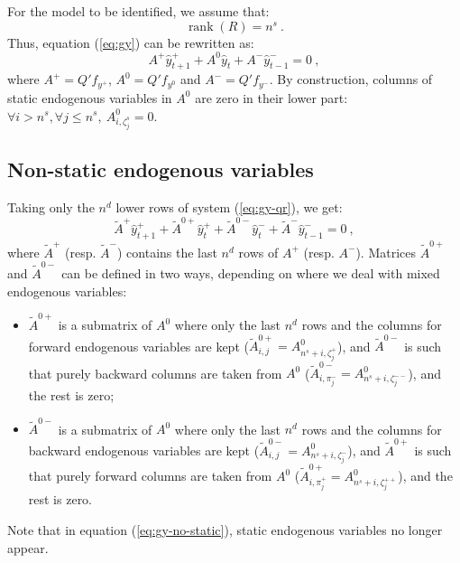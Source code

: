 \documentclass[11pt,a4paper]{article}
\begin{document}
For the model to be identified, we assume that:
\begin{equation}
  \label{eq:identification}
  \mathop{rank}(R) = n^s \: .
\end{equation}
Thus, equation (\ref{eq:gy}) can be rewritten as:
\begin{equation}
  \label{eq:gy-qr}
  A^+ \hat{y}^+_{t+1} + A^0 \hat{y}_t + A^- \hat{y}^-_{t-1} = 0 \: ,
\end{equation}
where $A^+ = Q'f_{y^+}$, $A^0 = Q'f_{y^0}$ and $A^- = Q'f_{y^-}$. By
construction, columns of static endogenous variables in $A^0$ are zero in their
lower part: $\forall i > n^s,\forall j\leq n^s, \: A^0_{i,\zeta^s_j} = 0$.

\subsection{Non-static endogenous variables}

Taking only the $n^d$ lower rows of system (\ref{eq:gy-qr}), we get:
\begin{equation}
  \label{eq:gy-no-static}
  \tilde{A}^+ \hat{y}^+_{t+1} + \tilde{A}^{0+} \hat{y}^+_t + \tilde{A}^{0-} \hat{y}^-_t + \tilde{A}^- \hat{y}^-_{t-1} = 0 \: ,
\end{equation}
where $\tilde{A}^+$ (resp. $\tilde{A}^-$) contains the last $n^d$ rows of $A^+$
(resp. $A^-$). Matrices $\tilde{A}^{0+}$ and $\tilde{A}^{0-}$ can be defined in
two ways, depending on where we deal with mixed endogenous variables:

\begin{itemize}
\item $\tilde{A}^{0+}$ is a submatrix of $A^0$ where only the last $n^d$ rows
  and the columns for forward endogenous variables are kept
  ($\tilde{A}^{0+}_{i,j} = A^0_{n^s+i, \zeta^+_j}$), and $\tilde{A}^{0-}$ is
  such that purely backward columns are taken from $A^0$
  ($\tilde{A}^{0-}_{i,\pi^-_j} = A^0_{n^s+i,\zeta^{--}_j}$), and the rest is
  zero;
\item $\tilde{A}^{0-}$ is a submatrix of $A^0$ where only the last $n^d$ rows
  and the columns for backward endogenous variables are kept
  ($\tilde{A}^{0-}_{i,j} = A^0_{n^s+i, \zeta^-_j}$), and $\tilde{A}^{0+}$ is
  such that purely forward columns are taken from $A^0$
  ($\tilde{A}^{0+}_{i,\pi^+_j} = A^0_{n^s+i,\zeta^{++}_j}$), and the rest is
  zero.
\end{itemize}
Note that in equation (\ref{eq:gy-no-static}), static endogenous variables no
longer appear.
\end{document}
